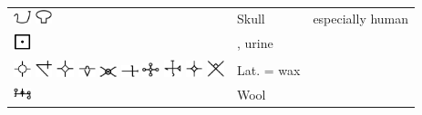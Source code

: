 \documentclass[british,final,landscape]{scrartcl}
\begin{document}
\begin{refsection}
\begin{supertabular}{p{0.3\textwidth}p{0.34\textwidth}p{0.34\textwidth}}
   \includegraphics[width=5mm]{Animal/Skull} \includegraphics[width=5mm]{Animal/Skull2} & Skull & especially human \\
   \includegraphics[width=5mm]{Animal/Urine} & , urine & \\
   \includegraphics[width=5mm]{Animal/Wachs} \includegraphics[width=5mm]{Animal/Wachs2} \includegraphics[width=5mm]{Animal/Wachs3} \includegraphics[width=5mm]{Animal/Wachs4} \includegraphics[width=5mm]{Animal/Wachs5} \includegraphics[width=5mm]{Animal/Wachs6} \includegraphics[width=5mm]{Animal/Wachs7} \includegraphics[width=5mm]{Animal/Wachs8} \includegraphics[width=5mm]{Animal/Wachs9} \includegraphics[width=5mm]{Animal/Wachs10}  & Lat.  = wax & \\
   \includegraphics[width=5mm]{Animal/Wool}  & Wool & \\
 \end{supertabular}


\end{refsection}
\end{document}
